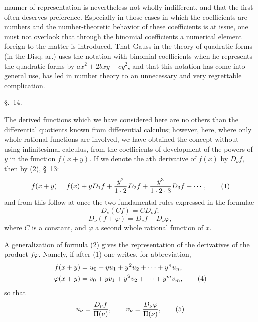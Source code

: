 
manner of representation is nevertheless not wholly indifferent, and that the first often deserves preference. Especially in those cases in which the coefficients are numbers and the number-theoretic behavior of these coefficients is at issue, one must not overlook that through the binomial coefficients a numerical element foreign to the matter is introduced. That Gauss in the theory of quadratic forms (in the Disq. ar.) uses the notation with binomial coefficients when he represents the quadratic forms by $ax^2+2bxy+cy^2$, and that this notation has come into general use, has led in number theory to an unnecessary and very regrettable complication.

\begin{center}
{\large \S.\ 14.}

\vspace{0.5em}
{\large{}}
\end{center}

The derived functions which we have considered here are no others than the differential quotients known from differential calculus; however, here, where only whole rational functions are involved, we have obtained the concept without using infinitesimal calculus, from the coefficients of development of the powers of $y$ in the function $f(x+y)$. If we denote the $\nu$th derivative of $f(x)$ by $D_\nu f$, then by (2), \S~13:
\begin{equation}
 f(x+y)=f(x)+yD_1f+{y^2\over1\cdot2}D_2f+{y^3\over1\cdot2\cdot3}D_3f+\cdots,
\tag{1}
\end{equation}
and from this follow at once the two fundamental rules expressed in the formulae
\begin{equation}
 D_\nu(Cf)=C D_\nu f;
\tag{2}
\end{equation}
\begin{equation}
 D_\nu(f+\varphi)=D_\nu f+D_\nu\varphi,
\tag{3}
\end{equation}
where $C$ is a constant, and $\varphi$ a second whole rational function of $x$.

A generalization of formula (2) gives the representation of the derivatives of the product $f\varphi$. Namely, if after (1) one writes, for abbreviation,
\begin{align}
 f(x+y)&=u_0+yu_1+y^2u_2+\cdots+y^n u_n,\notag\\
 \varphi(x+y)&=v_0+yv_1+y^2v_2+\cdots+y^m v_m,
\tag{4}
\end{align}
so that
\begin{equation}
 u_\nu={D_\nu f\over\Pi(\nu)},\qquad
 v_\nu={D_\nu\varphi\over\Pi(\nu)},
\tag{5}
\end{equation}
